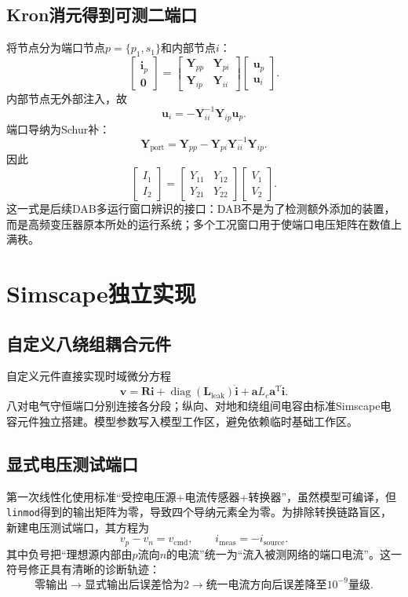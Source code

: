 \documentclass[UTF8,12pt,a4paper]{ctexart}
\newcommand{\Yp}{\bm{Y}_{\mathrm{port}}}
\newcommand{\Rmat}{\bm{R}}
\begin{document}
\subsection{Kron消元得到可测二端口}
将节点分为端口节点\(p=\{p_1,s_1\}\)和内部节点\(i\)：
\[
\begin{bmatrix}\bm{i}_p\\\bm{0}\end{bmatrix}
=
\begin{bmatrix}
\bm{Y}_{pp}&\bm{Y}_{pi}\\
\bm{Y}_{ip}&\bm{Y}_{ii}
\end{bmatrix}
\begin{bmatrix}\bm{u}_p\\\bm{u}_i\end{bmatrix}.
\]
内部节点无外部注入，故
\[
\bm{u}_i=-\bm{Y}_{ii}^{-1}\bm{Y}_{ip}\bm{u}_p.
\]
端口导纳为Schur补：
\[
\boxed{
\Yp
=\bm{Y}_{pp}
-\bm{Y}_{pi}\bm{Y}_{ii}^{-1}\bm{Y}_{ip}
}.
\]
因此
\[
\begin{bmatrix}I_1\\I_2\end{bmatrix}
=
\begin{bmatrix}Y_{11}&Y_{12}\\Y_{21}&Y_{22}\end{bmatrix}
\begin{bmatrix}V_1\\V_2\end{bmatrix}.
\]
这一式是后续DAB多运行窗口辨识的接口：DAB不是为了检测额外添加的装置，而是高频变压器原本所处的运行系统；多个工况窗口用于使端口电压矩阵在数值上满秩。

\section{Simscape独立实现}

\subsection{自定义八绕组耦合元件}
自定义元件直接实现时域微分方程
\[
\bm{v}
=\Rmat\bm{i}
+\operatorname{diag}(\bm{L}_{\mathrm{leak}})\dot{\bm{i}}
+\bm{a}L_c\bm{a}^{\mathrm T}\dot{\bm{i}}.
\]
八对电气守恒端口分别连接各分段；纵向、对地和绕组间电容由标准Simscape电容元件独立搭建。模型参数写入模型工作区，避免依赖临时基础工作区。

\subsection{显式电压测试端口}
第一次线性化使用标准“受控电压源+电流传感器+转换器”，虽然模型可编译，但\texttt{linmod}得到的输出矩阵为零，导致四个导纳元素全为零。为排除转换链路盲区，新建电压测试端口，其方程为
\[
v_p-v_n=v_{\mathrm{cmd}},\qquad i_{\mathrm{meas}}=-i_{\mathrm{source}}.
\]
其中负号把“理想源内部由\(p\)流向\(n\)的电流”统一为“流入被测网络的端口电流”。这一符号修正具有清晰的诊断轨迹：
\[
\text{零输出}\rightarrow
\text{显式输出后误差恰为2}\rightarrow
\text{统一电流方向后误差降至}10^{-9}\text{量级}.
\]
\end{document}
